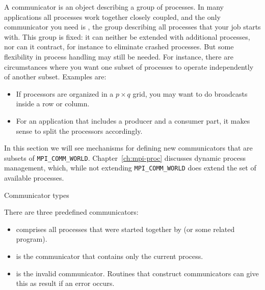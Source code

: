 
A communicator is an object describing a group of processes. In many 
applications all processes work together closely coupled, and the
only communicator you need is , the
group describing all processes that your job starts with.
%
This group is fixed: it can neither be extended with additional
processes, nor can it contract, for instance to eliminate crashed
processes. But some flexibility in process handling may still be
needed. For instance, there are 
circumstances where you want one subset of processes to operate 
independently of another subset. Examples are:
\begin{itemize}
\item If processors are organized in a $p\times q$ grid, you may want
  to do broadcasts inside a row or column. 
\item For an application that includes a producer and a consumer part,
  it makes sense to split the processors accordingly.
\end{itemize}
In this section we will see mechanisms for defining new communicators
that are subsets of \lstinline{MPI_COMM_WORLD}\nobreak.
Chapter~\ref{ch:mpi-proc} discusses dynamic process management, which, while
not extending \lstinline{MPI_COMM_WORLD} does extend the set of
available processes.

 {Communicator types}

There are three predefined communicators:
\begin{itemize}
\item {} comprises all processes that were started 
  together by  (or some related program).
\item {} is the communicator that contains only
   the current process.
\item {} is the invalid communicator. Routines
  that construct communicators can give this as result if an error occurs.
\end{itemize}

